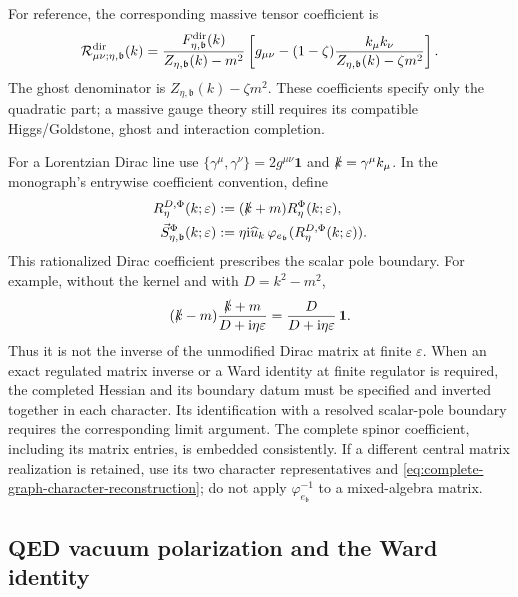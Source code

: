 \documentclass[final,5p,times,twocolumn,numbers,nopreprintline]{elsarticle}
\numberwithin{equation}{section}
\theoremstyle{definition}
\theoremstyle{remark}
\newcommand{\ii}{\mathrm i}
\newcommand{\bb}{\mathfrak b}
\newcommand{\Ph}{\Phi}
\newcommand{\one}{\mathbf 1}
\newcommand{\ee}{e_{\bb}}
\newcommand{\embed}{\varphi_{\ee}}
\begin{document}
For reference, the corresponding massive tensor coefficient is
\begin{equation}
 \mathcal R^{\rm dir}_{\mu\nu;\eta,\bb}(k)
 =\frac{F^{\rm dir}_{\eta,\bb}(k)}
           {Z_{\eta,\bb}(k)-m^2}
    \left[g_{\mu\nu}-(1-\zeta)
       \frac{k_\mu k_\nu}{Z_{\eta,\bb}(k)-\zeta m^2}\right].
 \label{eq:massive-directed-gauge-coefficient}
\end{equation}
The ghost denominator is
\(Z_{\eta,\bb}(k)-\zeta m^2\). These coefficients specify
only the quadratic part; a massive gauge theory still requires
its compatible Higgs/Goldstone, ghost and interaction completion.

For a Lorentzian Dirac line use
\(\{\gamma^\mu,\gamma^\nu\}=2g^{\mu\nu}\one\) and
\(\slashed k=\gamma^\mu k_\mu\). In the monograph's
entrywise coefficient convention, define
\begin{equation}
\begin{aligned}
 R^{D,\Ph}_\eta(k;\varepsilon)
   &:=(\slashed k+m)R^\Ph_\eta(k;\varepsilon),\\
 \vec S^{\Ph}_{\eta,\bb}(k;\varepsilon)
   &:=\eta\ii\widehat u_k\,
                     \embed(R^{D,\Ph}_\eta(k;\varepsilon)).
\end{aligned}
 \label{eq:physical-directed-Dirac-line}
\end{equation}
This rationalized Dirac coefficient prescribes the scalar pole
boundary. For example, without the kernel and with
\(D=k^2-m^2\),
\begin{equation}
 (\slashed k-m)
     \frac{\slashed k+m}{D+\ii\eta\varepsilon}
   =\frac{D}{D+\ii\eta\varepsilon}\,\one.
 \label{eq:Dirac-finite-boundary-check}
\end{equation}
Thus it is not the inverse of the unmodified Dirac matrix at
finite \(\varepsilon\). When an exact regulated matrix
inverse or a Ward identity at finite regulator is required, the
completed Hessian and its boundary datum must be specified and
inverted together in each character. Its identification with a
resolved scalar-pole boundary requires the corresponding limit
argument.
The complete spinor coefficient, including its matrix entries,
is embedded consistently. If a different central matrix
realization is retained, use its two character representatives
and \eqref{eq:complete-graph-character-reconstruction}; do not
apply \(\embed^{-1}\) to a mixed-algebra matrix.

\subsection{QED vacuum polarization and the Ward identity}
\label{sec:QED}
\end{document}
